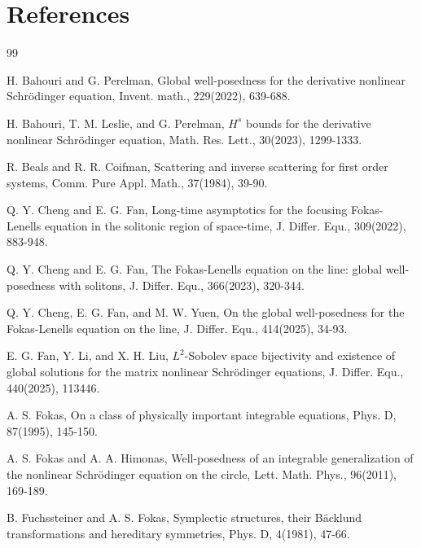 \documentclass[preprint,compress,12pt]{elsarticle}
\numberwithin{equation}{section}
\begin{document}
\section*{References}
\begin{thebibliography}{99}


H. Bahouri and G. Perelman, Global well-posedness for the derivative nonlinear Schr\"{o}dinger equation, Invent. math., 229(2022), 639-688.

H. Bahouri, T. M. Leslie, and G. Perelman, $H^{s}$ bounds for the derivative nonlinear Schr\"{o}dinger equation, Math. Res. Lett., 30(2023), 1299-1333.

R. Beals and R. R. Coifman, Scattering and inverse scattering for first order systems, Comm. Pure Appl. Math., 37(1984), 39-90.


Q. Y. Cheng and E. G. Fan, Long-time asymptotics for the focusing Fokas-Lenells equation in the solitonic region of space-time, J. Differ. Equ., 309(2022), 883-948.

Q. Y. Cheng and E. G. Fan, The Fokas-Lenells equation on the line: global well-posedness with solitons, J. Differ. Equ., 366(2023), 320-344.

Q. Y. Cheng, E. G. Fan, and M. W. Yuen, On the global well-posedness for the Fokas-Lenells equation on the line, J. Differ. Equ., 414(2025), 34-93.

E. G. Fan, Y. Li, and X. H. Liu, $L^2$-Sobolev space bijectivity and existence of global solutions for the matrix nonlinear Schr\"{o}dinger equations, J. Differ. Equ., 440(2025), 113446.

A. S. Fokas, On a class of physically important integrable equations, Phys. D, 87(1995), 145-150.

A. S. Fokas and A. A. Himonas, Well-posedness of an integrable generalization of the nonlinear Schr\"{o}dinger equation on the circle, Lett. Math. Phys., 96(2011), 169-189.

B. Fuchssteiner and A. S. Fokas, Symplectic structures, their B\"{a}cklund transformations and hereditary symmetries, Phys. D, 4(1981), 47-66.


\end{thebibliography}
\end{document}
